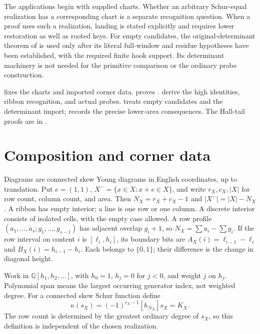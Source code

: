 \documentclass[11pt,a4paper]{amsart}
\numberwithin{equation}{section}
\theoremstyle{plain}
\theoremstyle{definition}
\begin{document}
The applications begin with supplied charts.  Whether an arbitrary Schur-equal realization has a corresponding chart is a separate recognition question.  When a proof uses such a realization, landing is stated explicitly and requires lower restoration as well as rooted keys.  For empty candidates, the original-determinant theorem of \cite{Shields2026CornerDescent} is used only after its literal full-window and residue hypotheses have been established, with the required finite hook support.  Its determinant machinery is not needed for the primitive comparison or the ordinary probe construction.

 fixes the charts and imported corner data.   proves .   derive the high identities, ribbon recognition, and actual probes.   treats empty candidates and the determinant import;  records the precise lower-area consequences.  The Hall-tail proofs are in .

\section{Composition and corner data}\label{sec:scope}

Diagrams are connected skew Young diagrams in English coordinates, up to translation.  Put \(e=(1,1)\), \(X^- =\{x\in X:x+e\in X\}\), and write \(r_X,c_X,|X|\) for row count, column count, and area.  Then \(N_X=r_X+c_X-1\) and \(|X^-|=|X|-N_X\).  A ribbon has empty interior; a line is one row or one column.  A discrete interior consists of isolated cells, with the empty case allowed.  A row profile \((a_1,\ldots,a_s;g_1,\ldots,g_{s-1})\) has adjacent overlap \(g_i+1\), so \(N_X=\sum a_i-\sum g_i\).  If the row interval on content \(i\) is \([\ell_i,h_i]\), its boundary bits are \(A_X(i)=\ell_{i-1}-\ell_i\) and \(B_X(i)=h_{i-1}-h_i\).  Each belongs to \(\{0,1\}\); their difference is the change in diagonal height.

Work in \(\mathbb Q[h_1,h_2,\ldots]\), with \(h_0=1\), \(h_j=0\) for \(j<0\), and weight \(j\) on \(h_j\).  Polynomial span means the largest occurring generator index, not weighted degree.  For a connected skew Schur function define
\[
 \kappa(s_X)=(-1)^{r_X-1}[h_{N_X}]s_X=K_X.
\]
The row count is determined by the greatest ordinary degree of \(s_X\), so this definition is independent of the chosen realization.
\end{document}
